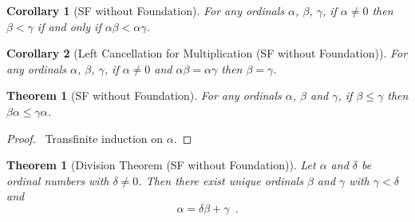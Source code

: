 \documentclass{book}
\let\qed\relax
\newtheorem{cor}{Corollary}[ax]
\newtheorem{thm}[ax]{Theorem}
\theoremstyle{definition}
\begin{document}
\begin{cor}[SF without Foundation]
For any ordinals $\alpha$, $\beta$, $\gamma$, if $\alpha \neq 0$ then $\beta < \gamma$ if and only if $\alpha \beta < \alpha \gamma$.
\end{cor}

\begin{cor}[Left Cancellation for Multiplication (SF without Foundation)]
For any ordinals $\alpha$, $\beta$, $\gamma$, if $\alpha \neq 0$ and $\alpha \beta = \alpha \gamma$ then $\beta = \gamma$.
\end{cor}

\begin{thm}[SF without Foundation]
For any ordinals $\alpha$, $\beta$ and $\gamma$, if $\beta \leq \gamma$ then $\beta \alpha \leq \gamma \alpha$.
\end{thm}

\begin{proof}
\pf\ Transfinite induction on $\alpha$. \qed
\end{proof}

\begin{thm}[Division Theorem (SF without Foundation)]
Let $\alpha$ and $\delta$ be ordinal numbers with $\delta \neq 0$. Then there exist unique ordinals $\beta$ and $\gamma$ with $\gamma < \delta$ and
\[ \alpha = \delta \beta + \gamma \enspace . \]
\end{thm}
\end{document}
